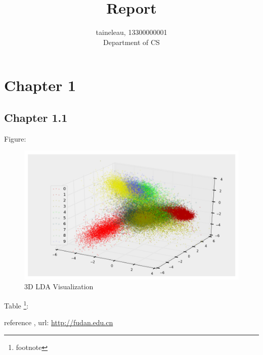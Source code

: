 \documentclass[11pt, oneside]{article}
\begin{document}
\title{Report}
\author{taineleau, 13300000001 \\ Department of CS}
\maketitle
\section{Chapter 1}
\subsection{Chapter 1.1}

Figure:

\begin{figure}[!htbp]
\centering
\includegraphics[width=0.9\linewidth]{fig/3d_lda.png}
   \caption{3D LDA Visualization}
\label{fig:3d_lda}
\end{figure}


Table \footnote{footnote}:

\begin{table}[!htbp]
  \centering
\caption{Error rate}
\label{tb:lda_knn}
\end{table}

reference \cite{bishop2006pattern}, url: \url{http://fudan.edu.cn}



\end{document}

